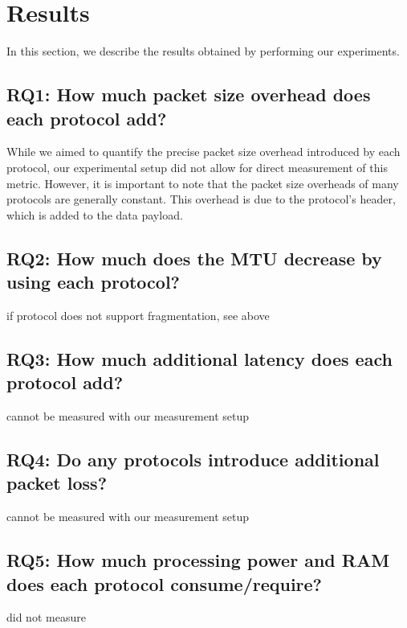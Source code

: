 
\chapter{Results}
\label{chap:results}

In this section, we describe the results obtained by performing our
experiments.


\section{RQ1: How much packet size overhead does each protocol add?}
While we aimed to quantify the precise packet size overhead introduced by each protocol, our experimental setup did not allow for direct measurement of this metric.
However, it is important to note that the packet size overheads of many protocols are generally constant.
This overhead is due to the protocol's header, which is added to the data payload.

\section{RQ2: How much does the MTU decrease by using each protocol?}
if protocol does not support fragmentation, see above

\section{RQ3: How much additional latency does each protocol add?}
cannot be measured with our measurement setup

\section{RQ4: Do any protocols introduce additional packet loss?}
cannot be measured with our measurement setup

\section{RQ5: How much processing power and RAM does each protocol consume/require?}
did not measure

